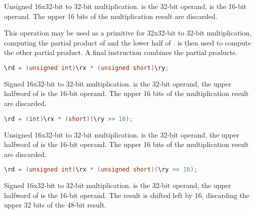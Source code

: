 Unsigned 16x32-bit to 32-bit multiplication. \code{\rx} is the 32-bit operand,
\code{\ry} is the 16-bit operand. The upper 16 bits of the multiplication result
are discarded.

This operation may be used as a primitive for 32x32-bit to 32-bit
multiplication, computing the partial product of \code{\rx} and the lower half
of \code{\ry}.  is then used to compute the other partial product. A
final  instruction combines the partial products.

\begin{lstlisting}[numbers=none, basicstyle=\ttfamily\footnotesize, language=C++]
\rd = (unsigned int)\rx * (unsigned short)\ry;
\end{lstlisting}

Signed 16x32-bit to 32-bit multiplication. \code{\rx} is the 32-bit operand, the 
upper halfword of \code{\ry} is the 16-bit operand. The upper 16 bits of the 
multiplication result are discarded.

\begin{lstlisting}[numbers=none, basicstyle=\ttfamily\footnotesize, language=C++]
\rd = (int)\rx * (short)(\ry >> 16);
\end{lstlisting}

Unsigned 16x32-bit to 32-bit multiplication. \code{\rx} is the 32-bit operand, 
the upper halfword of \code{\ry} is the 16-bit operand. The upper 16 bits of the 
multiplication result are discarded.

\begin{lstlisting}[numbers=none, basicstyle=\ttfamily\footnotesize, language=C++]
\rd = (unsigned int)\rx * (unsigned short)(\ry >> 16);
\end{lstlisting}

Signed 16x32-bit to 32-bit multiplication. \code{\rx} is the 32-bit operand, the 
upper halfword of \code{\ry} is the 16-bit operand. The result is shifted left
by 16, discarding the upper 32 bits of the 48-bit result.

